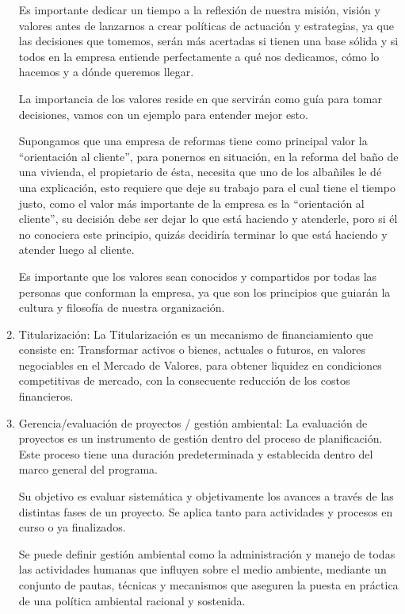 \documentclass[letterpaper,12pt]{article}
\begin{document}
\begin{sloppypar}
\begin{enumerate}
    Es importante dedicar un tiempo a la reflexión de nuestra misión, visión y valores antes de lanzarnos a crear políticas de actuación y estrategias, ya que las decisiones que tomemos, serán más acertadas si tienen una base sólida y si todos en la empresa entiende perfectamente a qué nos dedicamos, cómo lo hacemos y a dónde queremos llegar.

    La importancia de los valores reside en que servirán como guía para tomar decisiones, vamos con un ejemplo para entender mejor esto.

Supongamos que una empresa de reformas tiene como principal valor la “orientación al cliente”, para ponernos en situación, en la reforma del baño de una vivienda, el propietario de ésta, necesita que uno de los albañiles le dé una explicación, esto requiere que deje su trabajo para el cual tiene el tiempo justo, como el valor más importante de la empresa es la “orientación al cliente”, su decisión debe ser dejar lo que está haciendo y atenderle, poro si él no conociera este principio, quizás decidiría terminar lo que está haciendo y atender luego al cliente.  

Es importante que los valores sean conocidos y compartidos por todas las personas que conforman la empresa, ya que son los principios que guiarán la cultura y filosofía de nuestra organización.

\item Titularización:  La Titularización es un mecanismo de financiamiento que consiste en: Transformar activos o bienes, actuales o futuros, en valores negociables en el Mercado de Valores, para obtener liquidez en condiciones competitivas de mercado, con la consecuente reducción de los costos financieros.
\item Gerencia/evaluación de proyectos / gestión ambiental: La evaluación de proyectos es un instrumento de gestión dentro del proceso de planificación. Este proceso tiene una duración predeterminada y establecida dentro del marco general del programa. 

Su objetivo es evaluar sistemática y objetivamente los avances a través de las distintas fases de un proyecto. Se aplica tanto para actividades y procesos en curso o ya finalizados.

Se puede definir gestión ambiental como la administración y manejo de todas las actividades humanas que influyen sobre el medio ambiente, mediante un conjunto de pautas, técnicas y mecanismos que aseguren la puesta en práctica de una política ambiental racional y sostenida.







\end{enumerate}
\end{sloppypar}
\end{document}
